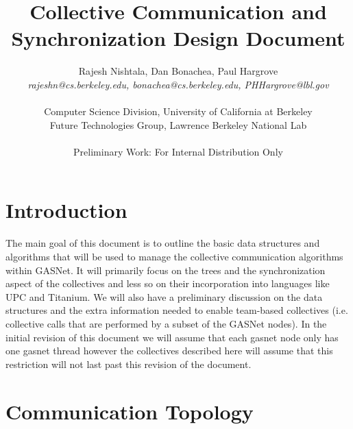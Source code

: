 \documentclass[times,10pt]{article}
\begin{document}

\title{Collective Communication and Synchronization Design Document}
\author{Rajesh Nishtala, Dan Bonachea, Paul Hargrove\\
    \emph{rajeshn@cs.berkeley.edu, bonachea@cs.berkeley.edu, PHHargrove@lbl.gov} \\\\
    Computer Science Division, University of California at Berkeley \\ 
    Future Technologies Group, Lawrence Berkeley National Lab\\ \\
    Preliminary Work: For Internal Distribution Only}
\maketitle

\newcommand{\REM}[1]{}

\section{Introduction}

The main goal of this document is to outline the basic data structures and algorithms that will be used to manage the collective communication algorithms within GASNet. It will primarily focus on the trees and the synchronization aspect of the collectives and less so on their incorporation into languages like UPC and Titanium. We will also have a preliminary discussion on the data structures and the extra information needed to enable team-based collectives (i.e. collective calls that are performed by a subset of the GASNet nodes). In the initial revision of this document we will assume that each gasnet node only has one gasnet thread however the collectives described here will assume that this restriction will not last past this revision of the document. 

\section{Communication Topology}
\end{document}

